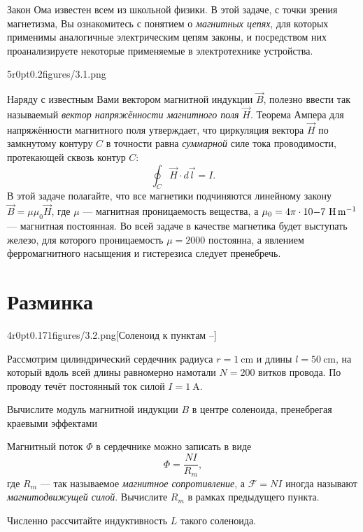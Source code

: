 
Закон Ома известен всем из школьной физики. В этой задаче, с точки зрения магнетизма, Вы ознакомитесь с понятием о \textit{магнитных цепях}, для которых применимы аналогичные электрическим цепям законы, и посредством них проанализируете некоторые применяемые в электротехнике устройства.

\pic5r{0pt}{0.2}{figures/3.1.png}

Наряду с известным Вами вектором магнитной индукции $\vec B$, полезно ввести так называемый \textit{вектор напряжённости магнитного поля} $\vec H$. Теорема Ампера для напряжённости магнитного поля утверждает, что циркуляция вектора $\vec H$ по замкнутому контуру $C$ в точности равна \textit{суммарной} силе тока проводимости, протекающей сквозь контур $C$:
$$
\oint_C\vec H\cdot d\vec l = I.
$$
В этой задаче полагайте, что все магнетики подчиняются линейному закону $\vec B = \mu\mu_0\vec H$, где $\mu$ --- магнитная проницаемость вещества, а $\mu_0=4\pi\cdot10{-7}~\unit{\H\per\m}$ --- магнитная постоянная. Во всей задаче в качестве магнетика будет выступать железо, для которого проницаемость $\mu=2000$ постоянна, а явлением ферромагнитного насыщения и гистерезиса следует пренебречь.

\part{Разминка}

\pic4r{0pt}{0.171}{figures/3.2.png}[Соленоид к пунктам --]

Рассмотрим цилиндрический сердечник радиуса $r=\qty{1}{\cm}$ и длины $l=\qty{50}{\cm}$, на который вдоль всей длины равномерно намотали $N=200$ витков провода. По проводу течёт постоянный ток силой $I=\qty{1}{\A}$.
\begin{task}
    \item Вычислите модуль магнитной индукции $B$ в центре соленоида, пренебрегая краевыми эффектами
\end{task}

\begin{task}
    \item Магнитный поток $\Phi$ в сердечнике можно записать в виде
    \begin{equation}\label{task:3.1}
    \Phi = \frac{NI}{R_m},
    \end{equation}
    где $R_m$ --- так называемое \textit{магнитное сопротивление}, а $\mathcal F=NI$ иногда называют \textit{магнитодвижущей силой}. Вычислите $R_m$ в рамках предыдущего пункта.
    \item Численно рассчитайте индуктивность $L$ такого соленоида.
\end{task}

